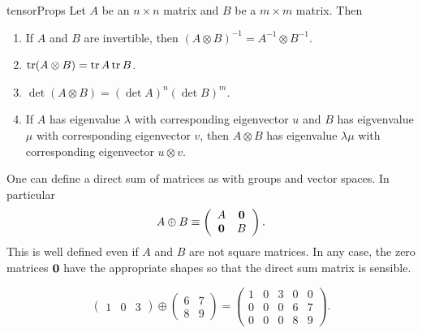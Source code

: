 \begin{proposition}{}{tensorProps}
Let $A$ be an $n\times n$ matrix and $B$ be a $m\times m$ matrix. Then
\begin{enumerate}
\item If $A$ and $B$ are invertible, then
$(A\otimes B)^{-1}=A^{-1}\otimes B^{-1}$.
\item $\tr(A\otimes B)=\tr A\tr B$.
\item $\det(A\otimes B)=(\det A)^n(\det B)^m$.
\item If $A$ has eigenvalue $\lambda$ with corresponding eigenvector
$u$ and $B$ has eigvenvalue $\mu$ with corresponding eigenvector $v$,
then $A\otimes B$ has eigenvalue $\lambda\mu$ with corresponding
eigenvector $u\otimes v$.
\end{enumerate}
\end{proposition}

One can define a direct sum of matrices as with
groups and vector spaces. In particular
\begin{equation}
A\oplus B\equiv
 \left(\begin{array}{cc}
 A & {\mathbf 0}  \\
 {\mathbf 0} & B 
 \end{array}\right).
\end{equation}
This is well defined even if $A$ and $B$ are not square matrices.
In any case, the zero matrices ${\mathbf 0}$ have the appropriate shapes
so that the direct sum matrix is sensible.

\begin{example}{}{}
$$
\left(\begin{array}{ccc}
1 & 0 & 3
\end{array}\right) \oplus\left(\begin{array}{cc}
6 & 7 \\
8 & 9
\end{array}\right)=\left(\begin{array}{ccccc}
1 & 0 & 3 & 0 & 0 \\
0 & 0 & 0 & 6 & 7 \\
0 & 0 & 0 & 8 & 9
\end{array}\right).
$$
\end{example}

